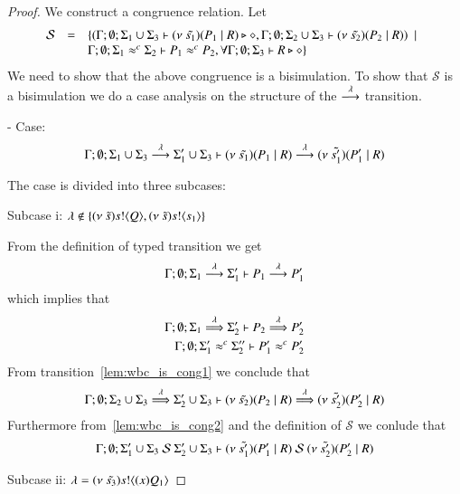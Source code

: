 \begin{proof}
	\noi We construct a congruence relation. Let
	\[
	\begin{array}{rcl}
		\mathcal{S} &=&	\{(\Gamma; \emptyset; \Sigma_1 \cup \Sigma_3 \vdash (\nu\ \tilde{s_1})(P_1 \;|\; R) \triangleright \diamond, \Gamma; \emptyset; \Sigma_2 \cup \Sigma_3 \vdash (\nu\ \tilde{s_2})(P_2 \;|\; R)) \ \ |\ \  \\
		& &	\Gamma;\emptyset;\Sigma_1 \approx^{c} \Sigma_2 \vdash P_1 \approx^{c} P_2, \forall \Gamma; \emptyset; \Sigma_3 \vdash R \triangleright \diamond\}
	\end{array}
	\]
	\noi We need to show that the above congruence is a bisimulation.
	To show that $\mathcal{S}$ is a bisimulation we do a case analysis on the structure
	of the $\stackrel{\lambda}{\longrightarrow}$ transition.


	\noi - Case: 
	\[
		\Gamma; \emptyset; \Sigma_1 \cup \Sigma_3 \stackrel{\lambda}{\longrightarrow} \Sigma_1' \cup \Sigma_3 \vdash (\nu\ \tilde{s_1})(P_1 \;|\; R) \stackrel{\lambda}{\longrightarrow} (\nu\ \tilde{s_1'})(P_1' \;|\; R)
	\]

	\noi The case is divided into three subcases:

	\noi Subcase i: $\lambda \notin \{(\nu\ \tilde{s}) s ! \langle Q \rangle, (\nu\ \tilde{s}) s ! \langle s_1 \rangle\}$

	\noi From the definition of typed transition we get
	\[
		\Gamma; \emptyset; \Sigma_1 \stackrel{\lambda}{\longrightarrow} \Sigma_1' \vdash P_1 \stackrel{\lambda}{\longrightarrow} P_1'
	\]
	\noi which implies that
%
	\begin{eqnarray}
		\Gamma; \emptyset; \Sigma_1 \stackrel{\lambda}{\Longrightarrow} \Sigma_2' \vdash P_2 \stackrel{\lambda}{\Longrightarrow} P_2' \label{lem:wbc_is_cong1}\\
		\Gamma; \emptyset; \Sigma_1' \approx^{c} \Sigma_2'' \vdash P_1' \approx^{c} P_2' \label{lem:wbc_is_cong2}
	\end{eqnarray}
%
	\noi From transition~\ref{lem:wbc_is_cong1} we conclude that 
	\[
		\Gamma;\emptyset; \Sigma_2 \cup \Sigma_3 \stackrel{\lambda}{\Longrightarrow} \Sigma_2' \cup \Sigma_3 \vdash (\nu\ \tilde{s_2})(P_2 \;|\; R) \stackrel{\lambda}{\Longrightarrow} (\nu\ \tilde{s_2'})(P_2' \;|\; R)
	\]
%
	\noi Furthermore from~\ref{lem:wbc_is_cong2} and the definition of $\mathcal{S}$ we conlude that
	\[
		\Gamma; \emptyset; \Sigma_1' \cup \Sigma_3\ \mathcal{S}\ \Sigma_2' \cup \Sigma_3 \proves \newsp{\tilde{s_1'}}{P_1' \Par R}\ \mathcal{S}\ \newsp{\tilde{s_2'}}{P_2' \Par R}
	\]

	\noi Subcase ii: $\lambda = (\nu\ \tilde{s_3}) s ! \langle (x)Q_1 \rangle$


\end{proof}
